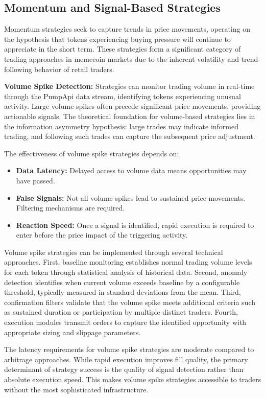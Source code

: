 \documentclass[12pt,a4paper]{article}
\begin{document}
\subsection{Momentum and Signal-Based Strategies}

Momentum strategies seek to capture trends in price movements, operating on the hypothesis that tokens experiencing buying pressure will continue to appreciate in the short term. These strategies form a significant category of trading approaches in memecoin markets due to the inherent volatility and trend-following behavior of retail traders.

\textbf{Volume Spike Detection:} Strategies can monitor trading volume in real-time through the PumpApi data stream, identifying tokens experiencing unusual activity. Large volume spikes often precede significant price movements, providing actionable signals. The theoretical foundation for volume-based strategies lies in the information asymmetry hypothesis: large trades may indicate informed trading, and following such trades can capture the subsequent price adjustment.

The effectiveness of volume spike strategies depends on:

\begin{itemize}
\item \textbf{Data Latency:} Delayed access to volume data means opportunities may have passed.
\item \textbf{False Signals:} Not all volume spikes lead to sustained price movements. Filtering mechanisms are required.
\item \textbf{Reaction Speed:} Once a signal is identified, rapid execution is required to enter before the price impact of the triggering activity.
\end{itemize}

Volume spike strategies can be implemented through several technical approaches. First, baseline monitoring establishes normal trading volume levels for each token through statistical analysis of historical data. Second, anomaly detection identifies when current volume exceeds baseline by a configurable threshold, typically measured in standard deviations from the mean. Third, confirmation filters validate that the volume spike meets additional criteria such as sustained duration or participation by multiple distinct traders. Fourth, execution modules transmit orders to capture the identified opportunity with appropriate sizing and slippage parameters.

The latency requirements for volume spike strategies are moderate compared to arbitrage approaches. While rapid execution improves fill quality, the primary determinant of strategy success is the quality of signal detection rather than absolute execution speed. This makes volume spike strategies accessible to traders without the most sophisticated infrastructure.
\end{document}
